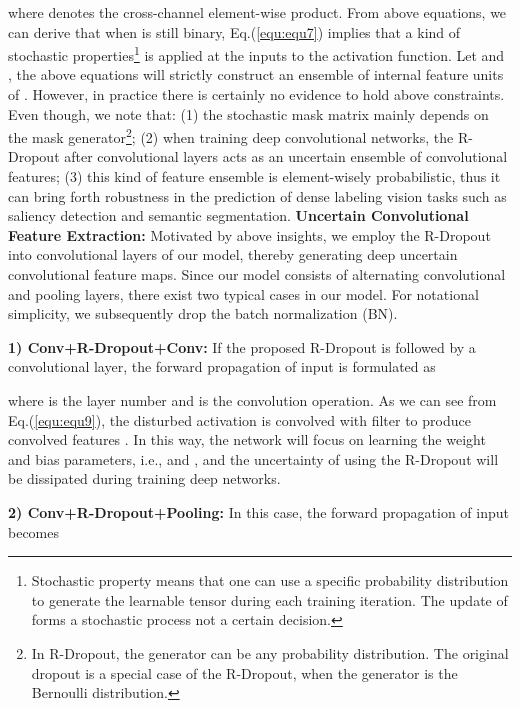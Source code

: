\documentclass[10pt,twocolumn,letterpaper]{article}
\begin{document}
where  denotes the cross-channel element-wise product.
From above equations, we can derive that when  is still binary, Eq.(\ref{equ:equ7}) implies that a kind of stochastic properties\footnote{Stochastic property means that one can use a specific probability distribution to generate the learnable tensor  during each training iteration. The update of  forms a stochastic process not a certain decision.} is applied at the inputs to the activation function.
Let  and , the above equations will strictly construct an ensemble of internal feature units of .
However, in practice there is certainly no evidence to hold above constraints.
Even though, we note that:
(1) the stochastic mask matrix  mainly depends on the mask generator\footnote{In R-Dropout, the generator can be any probability distribution. The original dropout is a special case of the R-Dropout, when the generator is the Bernoulli distribution.};
(2) when training deep convolutional networks, the R-Dropout after convolutional layers acts as an uncertain ensemble of convolutional features;
(3) this kind of feature ensemble is element-wisely probabilistic, thus it can bring forth robustness in the prediction of dense labeling vision tasks such as saliency detection and semantic segmentation.
\vspace{-5mm}
{\flushleft\textbf{Uncertain Convolutional Feature Extraction:}} Motivated by above insights, we employ the R-Dropout into convolutional layers of our model, thereby generating deep uncertain convolutional feature maps.
Since our model consists of alternating convolutional and pooling layers, there exist two typical cases in our model.
For notational simplicity, we subsequently drop the batch normalization (BN).


\textbf{1) Conv+R-Dropout+Conv:}
If the proposed R-Dropout is followed by a convolutional layer, the forward propagation of input is formulated as

\vspace{-7mm}

\vspace{-7mm}

where  is the layer number and  is the convolution operation. As we can see from Eq.(\ref{equ:equ9}), the disturbed activation  is convolved with filter  to produce convolved features .
In this way, the network will focus on learning the weight and bias parameters, i.e.,  and , and the uncertainty of using the R-Dropout will be dissipated during training deep networks.

\textbf{2) Conv+R-Dropout+Pooling:}
In this case, the forward propagation of input becomes
\end{document}
